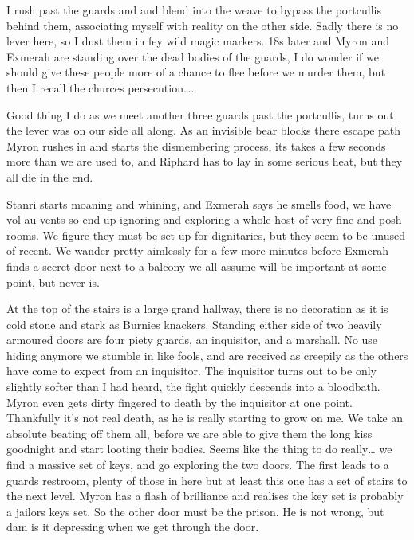 I rush past the guards and and blend into the weave to bypass the portcullis behind them, associating myself with reality on the other side. Sadly there is no lever here, so I dust them in fey wild magic markers. 18s later and Myron and Exmerah are standing over the dead bodies of the guards, I do wonder if we should give these people more of a chance to flee before we murder them, but then I recall the churces persecution….\medskip

Good thing I do as we meet another three guards past the portcullis, turns out the lever was on our side all along. As an invisible bear blocks there escape path Myron rushes in and starts the dismembering process, its takes a few seconds more than we are used to, and Riphard has to lay in some serious heat, but they all die in the end.\medskip

Stanri starts moaning and whining, and Exmerah says he smells food, we have vol au vents so end up ignoring and exploring a whole host of very fine and posh rooms. We figure they must be set up for dignitaries, but they seem to be unused of recent. We wander pretty aimlessly for a few more minutes before Exmerah finds a secret door next to a balcony we all assume will be important at some point, but never is.\medskip

At the top of the stairs is a large grand hallway, there is no decoration as it is cold stone and stark as Burnies knackers. Standing either side of two heavily armoured doors are four piety guards, an inquisitor, and a marshall. No use hiding anymore we stumble in like fools, and are received as creepily as the others have come to expect from an inquisitor. The inquisitor turns out to be only slightly softer than I had heard, the fight quickly descends into a bloodbath. Myron even gets dirty fingered to death by the inquisitor at one point. Thankfully it's not real death, as he is really starting to grow on me. We take an absolute beating off them all, before we are able to give them the long kiss goodnight and start looting their bodies. Seems like the thing to do really… we find a massive set of keys, and go exploring the two doors. The first leads to a guards restroom, plenty of those in here but at least this one has a set of stairs to the next level. Myron has a flash of brilliance and realises the key set is probably a jailors keys set. So the other door must be the prison. He is not wrong, but dam is it depressing when we get through the door.\medskip

